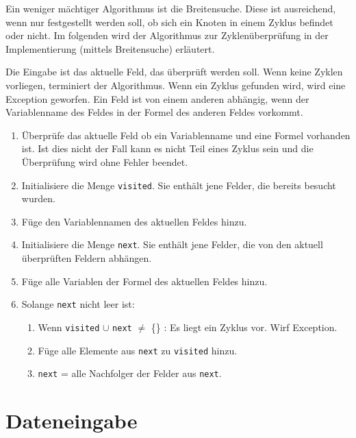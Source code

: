 Ein weniger mächtiger Algorithmus ist die Breitensuche. Diese ist ausreichend, wenn nur festgestellt werden soll, ob sich ein Knoten in einem Zyklus befindet oder nicht. Im folgenden wird der Algorithmus zur Zyklenüberprüfung in der Implementierung (mittels Breitensuche) erläutert.

Die Eingabe ist das aktuelle Feld, das überprüft werden soll. Wenn keine Zyklen vorliegen, terminiert der Algorithmus. Wenn ein Zyklus gefunden wird, wird eine Exception geworfen. Ein Feld ist von einem anderen abhängig, wenn der Variablenname des Feldes in der Formel des anderen Feldes vorkommt.

\begin{enumerate}
  \item Überprüfe das aktuelle Feld ob ein Variablenname und eine Formel vorhanden ist. Ist dies nicht der Fall kann es nicht Teil eines Zyklus sein und die Überprüfung wird ohne Fehler beendet.
  
  \item Initialisiere die Menge \texttt{visited}. Sie enthält jene Felder, die bereits besucht wurden. 

  \item Füge den Variablennamen des aktuellen Feldes hinzu.

  \item Initialisiere die Menge \texttt{next}. Sie enthält jene Felder, die von den aktuell überprüften Feldern abhängen.

  \item Füge alle Variablen der Formel des aktuellen Feldes hinzu.

  \item Solange \texttt{next} nicht leer ist:

    \begin{enumerate}
      \item Wenn \texttt{visited} $\cup$ \texttt{next} $\neq$ \{\} : Es liegt ein Zyklus vor. Wirf Exception.
      \item Füge alle Elemente aus \texttt{next} zu \texttt{visited} hinzu.
      \item \texttt{next} = alle Nachfolger der Felder aus \texttt{next}.
    \end{enumerate}
\end{enumerate}


\section{Dateneingabe}
\label{implementierung_daten_eingabe}

